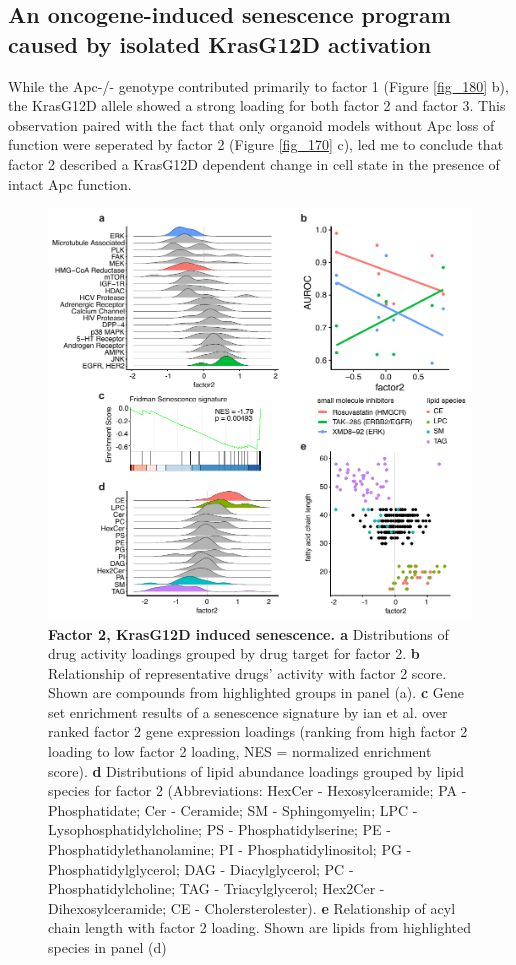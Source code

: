 \begin{flushleft}
\newpage

\section{An oncogene-induced senescence program caused by isolated KrasG12D activation}
While the Apc-/- genotype contributed primarily to factor 1 (Figure \ref{fig_180} b), the KrasG12D allele showed a strong loading for both factor 2 and factor 3. This observation paired with the fact that only organoid models without Apc loss of function were seperated by factor 2 (Figure \ref{fig_170} c), led me to conclude that factor 2 described a KrasG12D dependent change in cell state in the presence of intact Apc function.


\begin{figure}[h!]
\centering
\includegraphics[scale=0.75,
                keepaspectratio]{figures/adenomaprofiling/pdf/fig_3_1.pdf}
\caption{\textbf{Factor 2, KrasG12D induced senescence. a} Distributions of drug activity loadings grouped by drug target for factor 2. \textbf{b} Relationship of representative drugs’ activity with factor 2 score. Shown are compounds from highlighted groups in panel (a). \textbf{c} Gene set enrichment results of a senescence signature by ian et al. over ranked factor 2 gene expression loadings (ranking from high factor 2 loading to low factor 2 loading, NES = normalized enrichment score). \textbf{d} Distributions of lipid abundance loadings grouped by lipid species for factor 2 (Abbreviations: HexCer - Hexosylceramide; PA - Phosphatidate; Cer - Ceramide; SM - Sphingomyelin; LPC - Lysophosphatidylcholine; PS - Phosphatidylserine; PE - Phosphatidylethanolamine; PI - Phosphatidylinositol; PG - Phosphatidylglycerol; DAG - Diacylglycerol; PC - Phosphatidylcholine; TAG - Triacylglycerol; Hex2Cer - Dihexosylceramide; CE - Cholersterolester). \textbf{e} Relationship of acyl chain length with factor 2 loading. Shown are lipids from highlighted species in panel (d)}
\label{fig_200}
\end{figure}


\end{flushleft}
